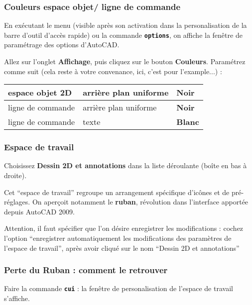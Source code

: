\documentclass[a4paper,12pt,french]{sphinxmanual}
\begin{document}
\subsubsection{Couleurs espace objet/ ligne de commande}
\label{acad/config_acad:couleurs-espace-objet-ligne-de-commande}
En exécutant le menu (visible après son activation dans la personalisation de la barre d'outil d'accès rapide)  ou la commande \textbf{\texttt{options}}, on affiche la fenêtre de paramétrage des options d'AutoCAD.

Allez sur l'onglet \textbf{Affichage}, puis cliquez sur le bouton \textbf{Couleurs}. Paramétrez comme suit (cela reste à votre convenance, ici, c'est pour l'example...) :

\noindent\begin{tabulary}{\linewidth}{|L|L|L|}
\hline

espace objet 2D
&
arrière plan uniforme
&
\textbf{Noir}
\\
\hline
ligne de commande
&
arrière plan uniforme
&
\textbf{Noir}
\\
\hline
ligne de commande
&
texte
&
\textbf{Blanc}
\\
\hline\end{tabulary}



\subsubsection{Espace de travail}
\label{acad/config_acad:espace-de-travail}
Choisissez \textbf{Dessin 2D et annotations} dans la liste déroulante (boîte en bas à droite).

Cet ``espace de travail'' regroupe un arrangement spécifique d'icônes et de pré-réglages. On aperçoit notamment le \textbf{ruban}, révolution dans l'interface apportée depuis AutoCAD 2009.

Attention, il faut spécifier que l'on désire enregistrer les modifications : cochez l'option ``enregistrer automatiquement les modifications des paramètres de l'espace de travail'', après avoir cliqué sur le nom ``Dessin 2D et annotations''


\subsubsection{Perte du Ruban : comment le retrouver}
\label{acad/config_acad:perte-du-ruban-comment-le-retrouver}
Faire la commande \textbf{\texttt{cui}} : la fenêtre de personalisation de l'espace de travail s'affiche.
\end{document}
